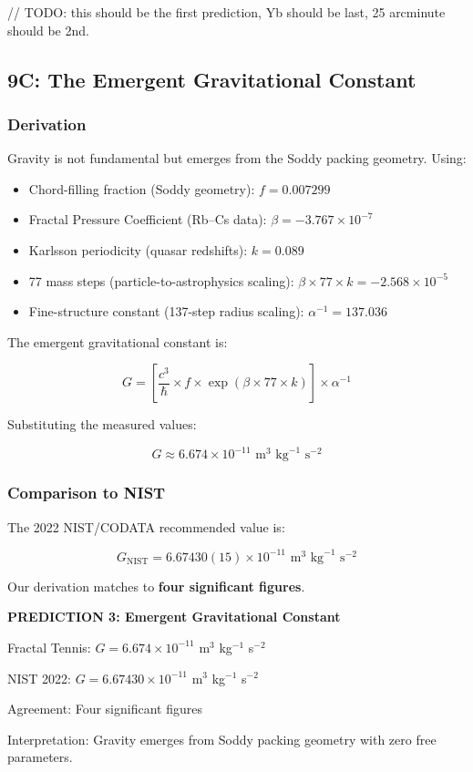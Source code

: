 \documentclass[11pt,a4paper]{article}
\begin{document}
// TODO: this should be the first prediction, Yb should be last, 25 arcminute should be 2nd.
\subsection{9C: The Emergent Gravitational Constant}

\subsubsection{Derivation}

Gravity is not fundamental but emerges from the Soddy packing geometry. Using:

\begin{itemize}
\item Chord-filling fraction (Soddy geometry): $f = 0.007299$
\item Fractal Pressure Coefficient (Rb--Cs data): $\beta = -3.767 \times 10^{-7}$
\item Karlsson periodicity (quasar redshifts): $k = 0.089$
\item 77 mass steps (particle-to-astrophysics scaling): $\beta \times 77 \times k = -2.568 \times 10^{-5}$
\item Fine-structure constant (137-step radius scaling): $\alpha^{-1} = 137.036$
\end{itemize}

The emergent gravitational constant is:

\[
G = \left[\frac{c^3}{\hbar} \times f \times \exp(\beta \times 77 \times k)\right] \times \alpha^{-1}
\]

Substituting the measured values:

\[
G \approx 6.674 \times 10^{-11} \text{ m}^3 \text{ kg}^{-1} \text{ s}^{-2}
\]

\subsubsection{Comparison to NIST}

The 2022 NIST/CODATA recommended value is:

\[
G_{\text{NIST}} = 6.67430(15) \times 10^{-11} \text{ m}^3 \text{ kg}^{-1} \text{ s}^{-2}
\]

Our derivation matches to \textbf{four significant figures}.

\begin{mdframed}
\centering
\textbf{PREDICTION 3: Emergent Gravitational Constant}

\vspace{0.5em}

Fractal Tennis: $G = 6.674 \times 10^{-11}$ m$^3$ kg$^{-1}$ s$^{-2}$

NIST 2022: $G = 6.67430 \times 10^{-11}$ m$^3$ kg$^{-1}$ s$^{-2}$

Agreement: Four significant figures

Interpretation: Gravity emerges from Soddy packing geometry with zero free parameters.
\end{mdframed}
\end{document}
